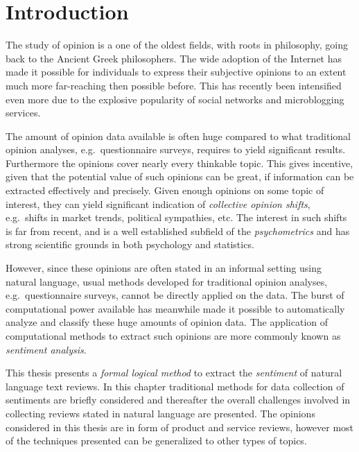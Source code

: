 
\chapter{Introduction}
The study of opinion is a one of the oldest fields, with roots in philosophy, going back to the Ancient Greek philosophers. The wide adoption of the Internet has made it possible for individuals to express their subjective opinions to an extent much more far-reaching then possible before. This has recently been intensified even more due to the explosive popularity of social networks and microblogging services. 

The amount of opinion data available is often huge compared to what traditional opinion analyses, e.g.\ questionnaire surveys, requires to yield significant results. Furthermore the opinions cover nearly every thinkable topic. This gives incentive, given that the potential value of such opinions can be great, if information can be extracted effectively and precisely. Given enough opinions on some topic of interest, they can yield significant indication of \emph{collective opinion shifts}, e.g.\ shifts in market trends, political sympathies, etc. 
The interest in such shifts is far from recent, and is a well established subfield of the \emph{psychometrics} and has strong scientific grounds in both psychology and statistics. 

However, since these opinions are often stated in an informal setting using natural language, usual methods developed for traditional opinion analyses, e.g.\ questionnaire surveys, cannot be directly applied on the data. The burst of computational power available has meanwhile made it possible to automatically analyze and classify these huge amounts of opinion data. The application of computational methods to extract such opinions are more commonly known as \emph{sentiment analysis}.

This thesis presents a \emph{formal logical method} to extract the \emph{sentiment} of natural language text reviews. In this chapter traditional methods for data collection of sentiments are briefly considered and thereafter the overall challenges involved in collecting reviews stated in natural language are presented. The opinions considered in this thesis are in form of product and service reviews, however most of the techniques presented can be generalized to other types of topics.

